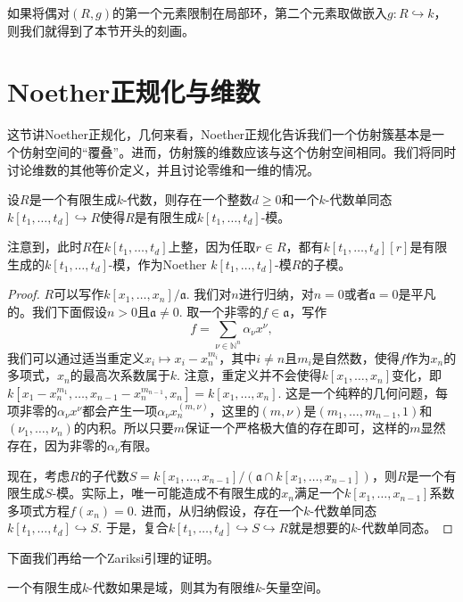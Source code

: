 如果将偶对$(R,g)$的第一个元素限制在局部环，第二个元素取做嵌入$g:R\hookrightarrow k$，则我们就得到了本节开头的刻画。

\section{Noether正规化与维数}

这节讲Noether正规化，几何来看，Noether正规化告诉我们一个仿射簇基本是一个仿射空间的“覆叠”。进而，仿射簇的维数应该与这个仿射空间相同。我们将同时讨论维数的其他等价定义，并且讨论零维和一维的情况。

\begin{pro}[Noether正规化引理]
设$R$是一个有限生成$k$-代数，则存在一个整数$d\geq 0$和一个$k$-代数单同态$k[t_1,\dots,t_d]\hookrightarrow R$使得$R$是有限生成$k[t_1,\dots,t_d]$-模。
\end{pro}

注意到，此时$R$在$k[t_1,\dots,t_d]$上整，因为任取$r\in R$，都有$k[t_1,\dots,t_d][r]$是有限生成的$k[t_1,\dots,t_d]$-模，作为Noether $k[t_1,\dots,t_d]$-模$R$的子模。

\begin{proof}
$R$可以写作$k[x_1,\dots,x_n]/\mathfrak a$. 我们对$n$进行归纳，对$n=0$或者$\mathfrak a=0$是平凡的。我们下面假设$n>0$且$\mathfrak a\neq 0$. 取一个非零的$f\in \mathfrak a$，写作
\[
	f=\sum_{\nu \in \mathbb N^n}\alpha_\nu x^\nu,
\]
我们可以通过适当重定义$x_i\mapsto x_i-x_n^{m_i}$，其中$i\neq n$且$m_i$是自然数，使得$f$作为$x_n$的多项式，$x_n$的最高次系数属于$k$. 注意，重定义并不会使得$k[x_1,\dots,x_n]$变化，即$k[x_1-x_n^{m_1},\dots,x_{n-1}-x_n^{m_{n-1}},x_n]=k[x_1,\dots,x_n]$. 这是一个纯粹的几何问题，每项非零的$\alpha_\nu x^\nu$都会产生一项$\alpha_\nu x_n^{(m,\nu)}$，这里的$(m,\nu)$是$(m_1,\dots,m_{n-1},1)$和$(\nu_1,\dots,\nu_n)$的内积。所以只要$m$保证一个严格极大值的存在即可，这样的$m$显然存在，因为非零的$\alpha_\nu$有限。

现在，考虑$R$的子代数$S=k[x_1,\dots,x_{n-1}]/(\mathfrak a\cap k[x_1,\dots,x_{n-1}])$，则$R$是一个有限生成$S$-模。实际上，唯一可能造成不有限生成的$x_n$满足一个$k[x_1,\dots,x_{n-1}]$系数多项式方程$f(x_n)=0$. 进而，从归纳假设，存在一个$k$-代数单同态$k[t_1,\dots,t_d]\hookrightarrow S$. 于是，复合$k[t_1,\dots,t_d]\hookrightarrow S\hookrightarrow R$就是想要的$k$-代数单同态。
\end{proof}

下面我们再给一个Zariksi引理的证明。

\begin{coro}[Zariski引理]
一个有限生成$k$-代数如果是域，则其为有限维$k$-矢量空间。
\end{coro}

